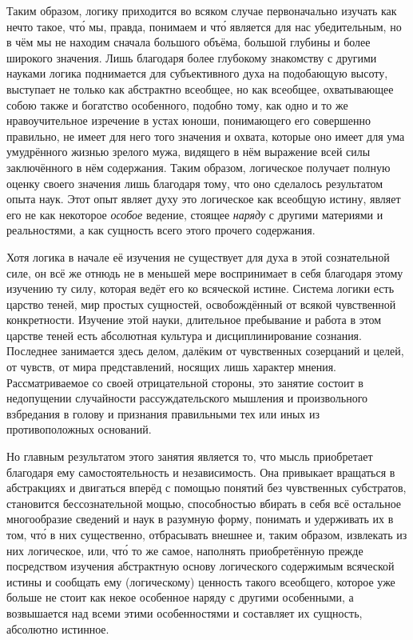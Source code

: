Таким образом, логику приходится во всяком случае первоначально изучать как
нечто такое, чт\'{о} мы, правда, понимаем и чт\'{о} является для нас
убедительным,
но в чём мы не находим сначала большого объёма, большой глубины и более
широкого значения. Лишь благодаря более глубокому знакомству с другими
науками логика поднимается для субъективного духа на подобающую высоту,
выступает не только как абстрактно всеобщее, но как всеобщее, охватывающее
собою также и богатство особенного, подобно тому, как одно и то же
нравоучительное изречение в устах юноши, понимающего его совершенно
правильно, не имеет для него того значения и охвата, которые оно имеет для
ума умудрённого жизнью зрелого мужа, видящего в нём выражение всей силы
заключённого в нём содержания. Таким образом, логическое получает полную
оценку своего значения лишь благодаря тому, что оно сделалось результатом
опыта наук. Этот опыт являет духу это логическое как всеобщую истину,
являет его не как некоторое {\em особое} ведение,
стоящее {\em наряду} с другими материями и
реальностями, а как сущность всего этого прочего содержания.

Хотя логика в начале её изучения не существует для духа в этой сознательной
силе, он всё же отнюдь не в меньшей мере воспринимает в себя благодаря
этому изучению ту силу, которая ведёт его ко всяческой истине. Система
логики есть царство теней, мир простых сущностей, освобождённый от всякой
чувственной конкретности. Изучение этой науки, длительное пребывание и
работа в этом царстве теней есть абсолютная культура и дисциплинирование
сознания. Последнее занимается здесь делом, далёким от чувственных
созерцаний и целей, от чувств, от мира представлений, носящих лишь характер
мнения. Рассматриваемое со своей отрицательной стороны, это занятие состоит
в недопущении случайности рассуждательского мышления и произвольного
взбредания в голову и признания правильными тех или иных из
противоположных оснований.

Но главным результатом этого занятия является то, что мысль приобретает
благодаря ему самостоятельность и независимость. Она привыкает вращаться в
абстракциях и двигаться вперёд с помощью понятий без чувственных
субстратов, становится бессознательной мощью, способностью вбирать в себя
всё остальное многообразие сведений и наук в разумную форму, понимать и
удерживать их в том, чт\'{о} в них существенно, отбрасывать внешнее и, таким
образом, извлекать из них логическое, или, чт\'{о} то же самое, наполнять
приобретённую прежде посредством изучения абстрактную основу логического
содержимым всяческой истины и сообщать ему (логическому) ценность такого
всеобщего, которое уже больше не стоит как некое особенное наряду с другими
особенными, а возвышается над всеми этими особенностями и составляет их
сущность, абсолютно истинное.

